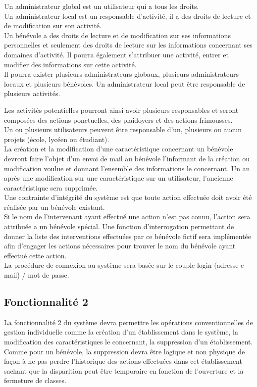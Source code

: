 Un administrateur global est un utilisateur qui a tous les droits. \\ Un administrateur local est un responsable d'activité, il a des droits de lecture et de modification sur son activité. \\ Un bénévole a des droits de lecture et de modification sur ses informations personnelles et seulement des droits de lecture sur les informations concernant ses domaines d'activité. Il pourra également s'attribuer une activité, entrer et modifier des informations sur cette activité.\\
Il pourra exister plusieurs administrateurs globaux, plusieurs administrateurs locaux et plusieurs bénévoles. Un administrateur local peut être responsable de plusieurs activités.



Les activités potentielles pourront ainsi avoir plusieurs responsables et seront composées des actions ponctuelles, des plaidoyers et des actions frimousses. \\

Un ou plusieurs utilisateurs peuvent être responsable d'un, plusieurs ou aucun projets (école, lycéen ou étudiant).\\

La création et la modification d'une caractéristique concernant un bénévole devront faire l'objet d'un envoi de mail au bénévole l'informant de la création ou modification voulue et donnant l'ensemble des informations le concernant. Un an après une modification sur une caractéristique sur un utilisateur, l'ancienne caractéristique sera supprimée. \\


Une contrainte d'intégrité du système est que toute action effectuée doit avoir été réalisée par un bénévole existant. \\
Si le nom de l'intervenant ayant effectué une action n'est pas connu, l'action sera attribuée a un bénévole spécial. Une fonction d'interrogation permettant de donner la liste des interventions effectuées par ce bénévole fictif sera implémentée afin d'engager les actions nécessaires pour trouver le nom du bénévole ayant effectué cette action. \\


La procédure de connexion au système sera basée sur le couple login (adresse e-mail) / mot de passe.




\subsection{Fonctionnalité 2}
La fonctionnalité 2 du système devra permettre les opérations conventionnelles de gestion individuelle comme la création d'un établissement dans le système, la modification des
caractéristiques le concernant, la suppression d'un établissement. Comme pour un bénévole, la suppression devra être logique et non physique de façon à ne pas perdre l'historique des actions effectuées dans cet établissement sachant que la disparition peut être temporaire en fonction de l'ouverture et la fermeture de classes. \\


